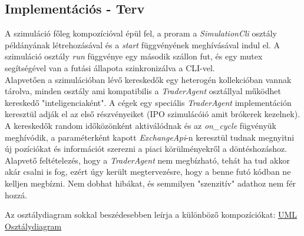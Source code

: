 \documentclass{article}[12pt,a4paper]
\begin{document}
    \subsection{Implementációs - Terv}
    A szimuláció főleg kompozícióval épül fel, a proram a \textit{SimulationCli} osztály példányának létrehozásával és a \textit{start} függvényének meghívásával indul el.
    A szimuláció osztály \textit{run} függvénye egy második szállon fut, és egy mutex segítségével van a futási állapota szinkronizálva a CLI-vel. \\
    Alapvetően a szimulációban lévő kereskedők egy heterogén kollekcióban vannak tárolva, minden osztály ami kompatibilis a \textit{TraderAgent} osztállyal működhet kereskedő "inteligenciaként".
    A cégek egy speciális \textit{TraderAgent} implementáción keresztül adják el az első részvényeiket (IPO szimulácóió amit brókerek kezelnek). \\
    A kereskedők random időközönként aktiválódnak és az \textit{on\_cycle} fügvényük meghívódik, a paraméterként kapott \textit{ExchangeApi}-n keresztül tudnak megnyitni új pozíciókat és információt szerezni a piaci körülményekről a döntéshozáshoz.\\
    Alapvető feltételezés, hogy a \textit{TraderAgent} nem megbízható, tehát ha tud akkor akár csalni is fog, ezért úgy került megtervezésre, hogy a benne futó kódban ne kelljen megbízni.
    Nem dobhat hibákat, és semmilyen "szenzitív" adathoz nem fér hozzá.

    Az osztálydiagram sokkal beszédesebben leírja a különböző kompozíciókat:
    \href{https://i.imgur.com/FbvPRx0.png}{UML Osztálydiagram}
\end{document}
